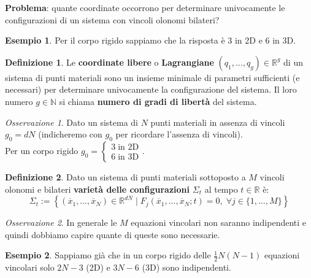 \documentclass{book}
\theoremstyle{plain}
\theoremstyle{plain}
\theoremstyle{plain}
\theoremstyle{plain}
\theoremstyle{plain}
\theoremstyle{definition}
\newtheorem{defi}{Definizione}[chapter]
\theoremstyle{remark}
\newtheorem*{oss}{Osservazione}
\theoremstyle{definition}
\newtheorem*{ex}{Esempio}
\begin{document}
\noindent \textbf{Problema}: quante coordinate occorrono per determinare univocamente le configurazioni di un sistema con vincoli olonomi bilateri?

\begin{ex}
    Per il corpo rigido sappiamo che la risposta è 3 in 2D e 6 in 3D.
\end{ex}

\begin{defi}
    Le \textbf{coordinate libere} o \textbf{Lagrangiane} $(q_1,\ldots,q_g) \in \mathbb{R}^g$ di un sistema di punti materiali sono un insieme minimale di parametri sufficienti (e necessari) per determinare univocamente la configurazione del sistema. Il loro numero $g \in \mathbb{N}$ si chiama \textbf{numero di gradi di libertà} del sistema.
\end{defi}

\begin{oss}
    Dato un sistema di $N$ punti materiali in assenza di vincoli $g_0=dN$ (indicheremo con $g_0$ per ricordare l'assenza di vincoli). \\Per un corpo rigido $g_0 =
    \begin{cases}
        3 \; \text{in 2D} \\ 6 \; \text{in 3D}
    \end{cases}$.
\end{oss}

\begin{defi}
    Dato un sistema di punti materiali sottoposto a $M$ vincoli olonomi e bilateri \textbf{varietà delle configurazioni} $\Sigma_t$ al tempo $t \in \mathbb{R}$ è:
    \begin{displaymath}
        \Sigma_{t}:=\left\{\left(\overline{x}_{1}, \ldots, \overline{x}_{N}\right) \in \mathbb{R}^{dN} \; | \; F_j\left(\overline{x}_{1}, \ldots, \overline{x}_{N}; t\right)=0, \; \forall j \in \{1,\ldots,M\}\right\}
    \end{displaymath}
\end{defi}

\begin{oss}
    In generale le $M$ equazioni vincolari non saranno indipendenti e quindi dobbiamo capire quante di queste sono necessarie.
\end{oss}

\begin{ex}
    Sappiamo già che in un corpo rigido delle $\frac{1}{2}N(N-1)$ equazioni vincolari solo $2N-3$ (2D) e $3N-6$ (3D) sono indipendenti.
\end{ex}
\end{document}
